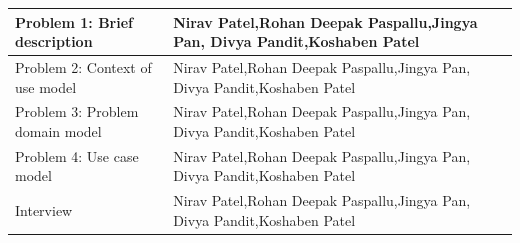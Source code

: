 \documentclass[11pt, english]{report}
\begin{document}
\begin{center}
\begin{tabular}{ | m{20em} | m{8cm}| } 
\hline
 Problem 1: Brief description& Nirav Patel,Rohan Deepak Paspallu,Jingya Pan,
Divya Pandit,Koshaben Patel\\ 
\hline
Problem 2: Context of use model & Nirav Patel,Rohan Deepak Paspallu,Jingya Pan,
Divya Pandit,Koshaben Patel\\ 
\hline
Problem 3: Problem domain model & Nirav Patel,Rohan Deepak Paspallu,Jingya Pan,
Divya Pandit,Koshaben Patel\\ 
\hline
Problem 4: Use case model & Nirav Patel,Rohan Deepak Paspallu,Jingya Pan,
Divya Pandit,Koshaben Patel\\ 
\hline
Interview & Nirav Patel,Rohan Deepak Paspallu,Jingya Pan,
Divya Pandit,Koshaben Patel\\ 
\hline
\end{tabular}
\end{center}


\newpage
\printbibliography
\newpage
\printglossary
\end{document}
